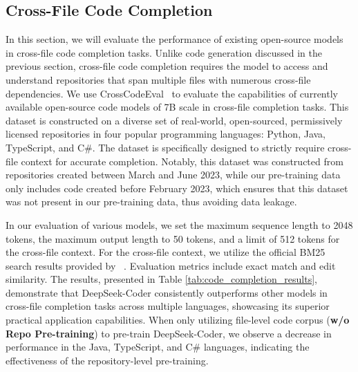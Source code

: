 \subsection{Cross-File Code Completion}
\label{sec:code_completion}
In this section, we will evaluate the performance of existing open-source models in cross-file code completion tasks. Unlike code generation discussed in the previous section, cross-file code completion requires the model to access and understand repositories that span multiple files with numerous cross-file dependencies. We use CrossCodeEval~\citep{ding2023crosscodeeval} to evaluate the capabilities of currently available open-source code models of 7B scale in cross-file completion tasks. This dataset is constructed on a diverse set of real-world, open-sourced, permissively licensed repositories in four popular programming languages: Python, Java, TypeScript, and C\#. The dataset is specifically designed to strictly require cross-file context for accurate completion. Notably, this dataset was constructed from repositories created between March and June 2023, while our pre-training data only includes code created before February 2023, which ensures that this dataset was not present in our pre-training data, thus avoiding data leakage.

In our evaluation of various models, we set the maximum sequence length to 2048 tokens, the maximum output length to 50 tokens, and a limit of 512 tokens for the cross-file context. For the cross-file context, we utilize the official BM25 search results provided by ~\cite{ding2023crosscodeeval}. Evaluation metrics include exact match and edit similarity. The results, presented in Table \ref{tab:code_completion_results}, demonstrate that DeepSeek-Coder consistently outperforms other models in cross-file completion tasks across multiple languages, showcasing its superior practical application capabilities. When only utilizing file-level code corpus ({\bf{w/o Repo Pre-training}}) to pre-train DeepSeek-Coder, we observe a decrease in performance in the Java, TypeScript, and C\# languages, indicating the effectiveness of the repository-level pre-training. 

